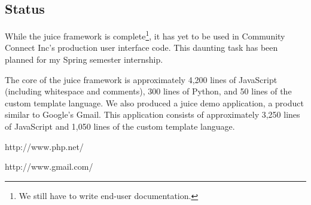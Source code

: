 \documentclass[10pt, twocolumn]{article}
\begin{document}
\subsection{Status}

While the juice framework is complete\footnote{We still have to
  write end-user documentation.}, it has yet to be used in
Community Connect Inc's production user interface code. This
daunting task has been planned for my Spring semester internship.

The core of the juice framework is approximately 4,200 lines of
JavaScript (including whitespace and comments), 300 lines of
Python, and 50 lines of the custom template language. We also
produced a juice demo application, a product similar to Google's
Gmail. This application consists of approximately 3,250 lines of
JavaScript and 1,050 lines of the custom template language.

\begin{thebibliography}{99}

 http://www.php.net/

 http://www.gmail.com/

\end{thebibliography}
\end{document}
